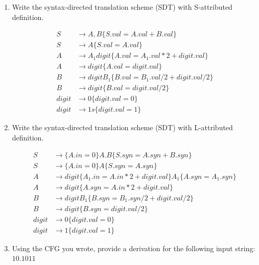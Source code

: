 \documentclass[a4paper]{exam}
\begin{document}
\begin{enumerate}
    \item Write the syntax-directed translation scheme (SDT) with S-attributed definition.
\begin{solution}
\begin{equation}
    \begin{aligned}
    S &\rightarrow A,B\{S.val = A.val+B.val\}\\
    S  &\rightarrow A\{S.val = A.val\} \\
    A  &\rightarrow A_{1}digit\{A.val = A_{1}.val*2+digit.val\} \\
    A  &\rightarrow digit\{A.val = digit.val\} \\
    B  &\rightarrow digit B_{1}\{B.val = B_{1}.val/2+digit.val/2\} \\
    B  &\rightarrow digit\{B.val = digit.val/2\} \\
    digit  &\rightarrow 0\{digit.val=0\}\\
    digit  &\rightarrow 1s\{digit.val=1\}
    \end{aligned}
\end{equation}
\end{solution}
\item Write the syntax-directed translation scheme (SDT) with L-attributed definition.
\begin{solution}
\begin{equation}
    \begin{aligned}
    S  &\rightarrow \{A.in=0\}A.B\{S.syn=A.syn+B.syn\} \\
    S  &\rightarrow \{A.in=0\}A\{S.syn=A.syn\} \\
    A  &\rightarrow digit\{A_{1}.in=A.in*2+digit.val\}A_{1}\{A.syn=A_{1}.syn\} \\
    A  &\rightarrow digit\{A.syn=A.in*2+digit.val\} \\
    B  &\rightarrow digit B_{1}\{B.syn=B_{1}.syn/2+digit.val/2\} \\
    B  &\rightarrow digit\{B.syn=digit.val/2\} \\
    digit  &\rightarrow 0\{digit.val=0\}\\
    digit  &\rightarrow 1\{digit.val=1\}
    \end{aligned}
\end{equation}
\end{solution}
\item Using the CFG you wrote, provide a derivation for the following input string: $10.1011$
\begin{solution}

\end{solution}
\end{enumerate}
\end{document}
